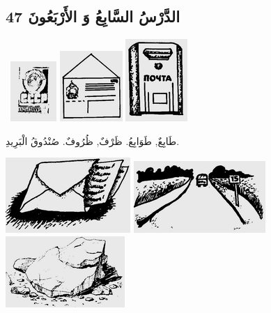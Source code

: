 \documentclass[a5paper]{article}
\begin{document}
\subsection{الدَّرْسُ السَّابِعُ وَ الأَرْبَعُونَ 47}
\  \includegraphics[width=0.6874in,height=0.8957in]{MuhammadBagauddinlatinized-img149.png}   \includegraphics[width=0.9374in,height=1.052in]{MuhammadBagauddinlatinized-img150.png}   \includegraphics[width=0.9272in,height=1.2291in]{MuhammadBagauddinlatinized-img151.png} 

طَابِعٌ, طَوَابِعُ. ظَرْفٌ, ظُرُوفٌ. صُنْدُوقُ الْبَرِيدِ.

 \includegraphics[width=1.8646in,height=1.1252in]{MuhammadBagauddinlatinized-img152.png}   \includegraphics[width=1.9689in,height=1.0728in]{MuhammadBagauddinlatinized-img153.png}   \includegraphics[width=1.7811in,height=1.0626in]{MuhammadBagauddinlatinized-img154.png} 
\end{document}
